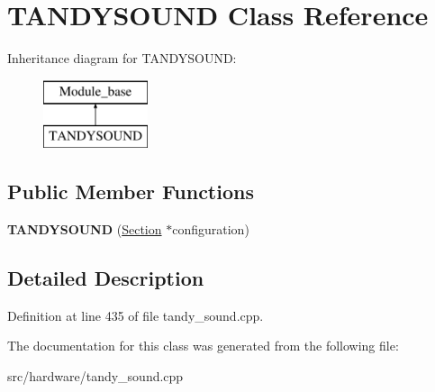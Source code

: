 \hypertarget{classTANDYSOUND}{\section{T\-A\-N\-D\-Y\-S\-O\-U\-N\-D Class Reference}
\label{classTANDYSOUND}
}
Inheritance diagram for T\-A\-N\-D\-Y\-S\-O\-U\-N\-D\-:\begin{figure}[H]
\begin{center}
\leavevmode
\includegraphics[height=2.000000cm]{classTANDYSOUND}
\end{center}
\end{figure}
\subsection*{Public Member Functions}
\begin{DoxyCompactItemize}
\item 
\hypertarget{classTANDYSOUND_a3595cf4fd040eb563c9ffb1dc69944b8}{{\bfseries T\-A\-N\-D\-Y\-S\-O\-U\-N\-D} (\hyperlink{classSection}{Section} $\ast$configuration)}\label{classTANDYSOUND_a3595cf4fd040eb563c9ffb1dc69944b8}

\end{DoxyCompactItemize}


\subsection{Detailed Description}


Definition at line 435 of file tandy\-\_\-sound.\-cpp.



The documentation for this class was generated from the following file\-:\begin{DoxyCompactItemize}
\item 
src/hardware/tandy\-\_\-sound.\-cpp\end{DoxyCompactItemize}

